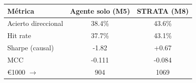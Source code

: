 \begin{tabular}{lcc}
    \toprule
    Métrica & Agente solo (M5) & STRATA (M8) \\
    \midrule
        Acierto direccional & 38.4\% & 43.6\% \\
        Hit rate & 37.7\% & 43.1\% \\
        Sharpe (causal) & -1.82 & +0.67 \\
        MCC & -0.111 & -0.084 \\
        \euro{}1000 $\to$ & 904 & 1069 \\
    \bottomrule
\end{tabular}
